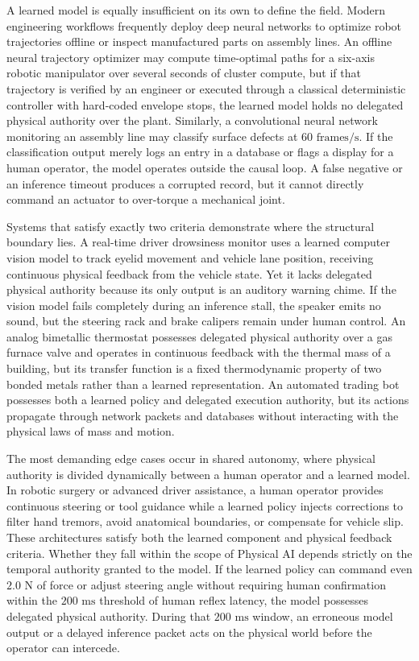 \documentclass[
  10pt,
  letterpaper,
  twoside,
  openright,
  numbers=noenddot,
  headings=standardclasses
]{scrbook}
\begin{document}
A learned model is equally insufficient on its own to define the field.
Modern engineering workflows frequently deploy deep neural networks to
optimize robot trajectories offline or inspect manufactured parts on
assembly lines. An offline neural trajectory optimizer may compute
time-optimal paths for a six-axis robotic manipulator over several
seconds of cluster compute, but if that trajectory is verified by an
engineer or executed through a classical deterministic controller with
hard-coded envelope stops, the learned model holds no delegated physical
authority over the plant. Similarly, a convolutional neural network
monitoring an assembly line may classify surface defects at
\(60\text{ frames/s}\). If the classification output merely logs an
entry in a database or flags a display for a human operator, the model
operates outside the causal loop. A false negative or an inference
timeout produces a corrupted record, but it cannot directly command an
actuator to over-torque a mechanical joint.

Systems that satisfy exactly two criteria demonstrate where the
structural boundary lies. A real-time driver drowsiness monitor uses a
learned computer vision model to track eyelid movement and vehicle lane
position, receiving continuous physical feedback from the vehicle state.
Yet it lacks delegated physical authority because its only output is an
auditory warning chime. If the vision model fails completely during an
inference stall, the speaker emits no sound, but the steering rack and
brake calipers remain under human control. An analog bimetallic
thermostat possesses delegated physical authority over a gas furnace
valve and operates in continuous feedback with the thermal mass of a
building, but its transfer function is a fixed thermodynamic property of
two bonded metals rather than a learned representation. An automated
trading bot possesses both a learned policy and delegated execution
authority, but its actions propagate through network packets and
databases without interacting with the physical laws of mass and motion.

The most demanding edge cases occur in shared autonomy, where physical
authority is divided dynamically between a human operator and a learned
model. In robotic surgery or advanced driver assistance, a human
operator provides continuous steering or tool guidance while a learned
policy injects corrections to filter hand tremors, avoid anatomical
boundaries, or compensate for vehicle slip. These architectures satisfy
both the learned component and physical feedback criteria. Whether they
fall within the scope of Physical AI depends strictly on the temporal
authority granted to the model. If the learned policy can command even
\(2.0\text{ N}\) of force or adjust steering angle without requiring
human confirmation within the \(200\text{ ms}\) threshold of human
reflex latency, the model possesses delegated physical authority. During
that \(200\text{ ms}\) window, an erroneous model output or a delayed
inference packet acts on the physical world before the operator can
intercede.
\end{document}
